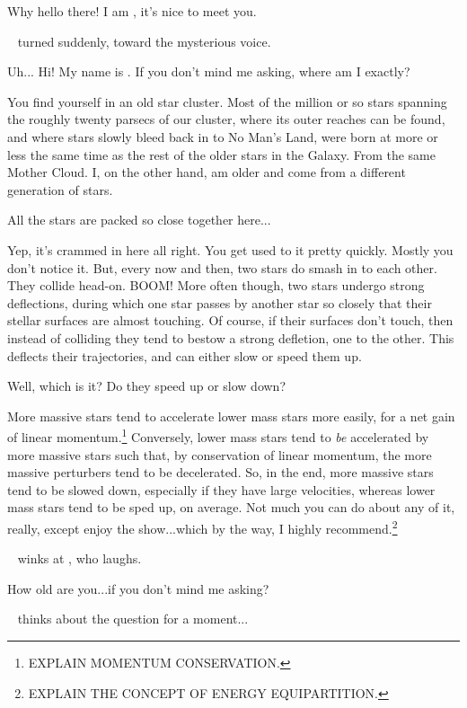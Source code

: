 \documentclass[main.tex]{subfiles}
\begin{document}
\newpara \Enrico Why hello there!  I am \rmenrico, it's nice to meet you.

\newpara \nar \rmsterope~ turned suddenly, toward the mysterious voice.

\newpara \Sterope Uh...  Hi!  My name is \rmsterope.  If you don't mind me asking, where am I exactly?

\newpara \Enrico You find yourself in an old star cluster.  Most of the million or so stars spanning the roughly twenty parsecs of our cluster, where its outer reaches can be found, and where stars slowly bleed back in to No Man's Land, were born at more or less the same time as the rest of the older stars in the Galaxy.  From the same Mother Cloud.  I, on the other hand, am older and come from a different generation of stars.  

\newpara \Sterope All the stars are packed so close together here...

\newpara \Enrico Yep, it's crammed in here all right.  You get used to it pretty quickly.  Mostly you don't notice it.  But, every now and then, two stars do smash in to each other.  They collide head-on.  BOOM!  More often though, two stars undergo strong deflections, during which one star passes by another star so closely that their stellar surfaces are almost touching.  Of course, if their surfaces don't touch, then instead of colliding they tend to bestow a strong defletion, one to the other.  This deflects their trajectories, and can either slow or speed them up.  

\newpara \Sterope Well, which is it?  Do they speed up or slow down?

\newpara \Enrico More massive stars tend to accelerate lower mass stars more easily, for a net gain of linear momentum.\footnote{EXPLAIN MOMENTUM CONSERVATION.} Conversely, lower mass stars tend to \textit{be} accelerated by more massive stars such that, by conservation of linear momentum, the more massive perturbers tend to be decelerated. So, in the end, more massive stars tend to be slowed down, especially if they have large velocities, whereas lower mass stars tend to be sped up, on average.  Not much you can do about any of it, really, except enjoy the show...which by the way, I highly recommend.\footnote{EXPLAIN THE CONCEPT OF ENERGY EQUIPARTITION.}

\newpara \nar \rmenrico~ winks at \rmsterope, who laughs.

\newpara \Sterope How old are you...if you don't mind me asking?

\newpara \nar \rmenrico~ thinks about the question for a moment...
\end{document}
